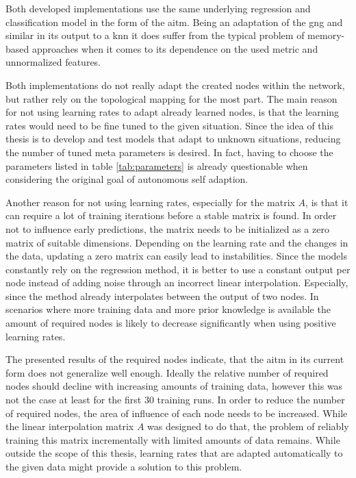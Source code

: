 Both developed implementations use the same underlying regression and classification model in the form of the \gls{aitm}. Being an adaptation of the \gls{gng} and similar in its output to a \gls{knn} it does suffer from the typical problem of memory-based approaches when it comes to its dependence on the used metric and unnormalized features.

Both implementations do not really adapt the created nodes within the network, but rather rely on the topological mapping for the most part. The main reason for not using learning rates to adapt already learned nodes, is that the learning rates would need to be fine tuned to the given situation. Since the idea of this thesis is to develop and test models that adapt to unknown situations, reducing the number of tuned meta parameters is desired. In fact, having to choose the parameters listed in table \ref{tab:parameters} is already questionable when considering the original goal of autonomous self adaption.

Another reason for not using learning rates, especially for the matrix $A$, is that it can require a lot of training iterations before a stable matrix is found. In order not to influence early predictions, the matrix needs to be initialized as a zero matrix of suitable dimensions. Depending on the learning rate and the changes in the data, updating a zero matrix can easily lead to instabilities.
Since the models constantly rely on the regression method, it is better to use a constant output per node instead of adding noise through an incorrect linear interpolation. Especially, since the method already interpolates between the output of two nodes.
In scenarios where more training data and more prior knowledge is available the amount of required nodes is likely to decrease significantly when using positive learning rates.

The presented results of the required nodes indicate, that the \gls{aitm} in its current form does not generalize well enough. Ideally the relative number of required nodes should decline with increasing amounts of training data, however this was not the case at least for the first 30 training runs. In order to reduce the number of required nodes, the area of influence of each node needs to be increased. While the linear interpolation matrix $A$ was designed to do that, the problem of reliably training this matrix incrementally with limited amounts of data remains. While outside the scope of this thesis, learning rates that are adapted automatically to the given data might provide a solution to this problem.

